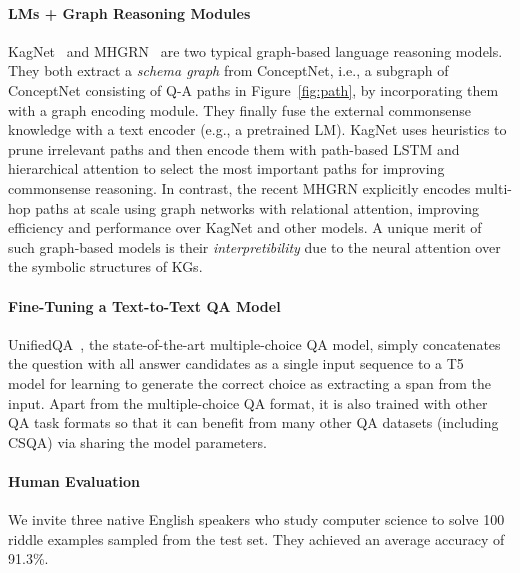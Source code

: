\paragraph{LMs + Graph Reasoning Modules}
KagNet~\cite{kagnet-emnlp19} and MHGRN~\cite{feng2020scalable} are two typical graph-based language reasoning models.
They both extract a \textit{schema graph} from ConceptNet, i.e., a subgraph of ConceptNet consisting of Q-A paths in Figure~\ref{fig:path},
by incorporating them with a graph encoding module.
They finally fuse the external commonsense knowledge with a text encoder (e.g., a pretrained LM). 
KagNet uses heuristics to prune irrelevant paths and then encode them with path-based LSTM and hierarchical attention to select the most important paths for improving commonsense reasoning.
In contrast, the recent MHGRN explicitly encodes multi-hop paths at scale using graph networks with relational attention, improving efficiency and performance over KagNet and other models.
A unique merit of such graph-based models is their \textit{interpretibility} due to the neural attention over the symbolic structures of KGs. 


\paragraph{Fine-Tuning a Text-to-Text QA Model}
{UnifiedQA}~\cite{khashabi2020unifiedqa}, the state-of-the-art multiple-choice QA model, simply concatenates the question with all answer candidates as a single input sequence to a T5~\cite{t5} model for learning to generate the correct choice as extracting a span from the input.
Apart from the multiple-choice QA format, it is also trained with other QA task formats so that it can benefit from many other QA datasets (including CSQA) via sharing the model parameters.

\paragraph{Human Evaluation}
We invite three native English speakers who study computer science to solve 100 riddle examples sampled from the test set.
They achieved an average accuracy of 91.3\%.





